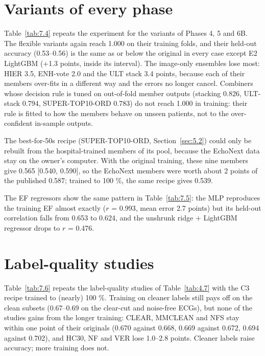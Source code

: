 \section{Variants of every phase}\label{sec:7.4}

Table~\ref{tab:7.4} repeats the experiment for the variants of Phases 4, 5 and 6B. The flexible variants again reach 1.000 on their training folds, and their held-out accuracy (0.53--0.56) is the same as or below the original in every case except E2 LightGBM (+1.3 points, inside its interval). The image-only ensembles lose most: HIER 3.5, ENH-vote 2.0 and the ULT stack 3.4 points, because each of their members over-fits in a different way and the errors no longer cancel. Combiners whose decision rule is tuned on out-of-fold member outputs (stacking 0.826, ULT-stack 0.794, SUPER-TOP10-ORD 0.783) do not reach 1.000 in training: their rule is fitted to how the members behave on unseen patients, not to the over-confident in-sample outputs.

The best-for-50s recipe (SUPER-TOP10-ORD, Section~\ref{sec:5.2}) could only be rebuilt from the hospital-trained members of its pool, because the EchoNext data stay on the owner's computer. With the original training, these nine members give 0.565 [0.540, 0.590], so the EchoNext members were worth about 2 points of the published 0.587; trained to 100 \%, the same recipe gives 0.539.



The EF regressors show the same pattern in Table~\ref{tab:7.5}: the MLP reproduces the training EF almost exactly ($r$ = 0.993, mean error 2.7 points) but its held-out correlation falls from 0.653 to 0.624, and the unshrunk ridge + LightGBM regressor drops to $r$ = 0.476.



\section{Label-quality studies}\label{sec:7.5}

Table~\ref{tab:7.6} repeats the label-quality studies of Table~\ref{tab:4.7} with the C3 recipe trained to (nearly) 100 \%. Training on cleaner labels still pays off on the clean subsets (0.67--0.69 on the clear-cut and noise-free ECGs), but none of the studies gains from the longer training: CLEAR, MMCLEAN and NFS stay within one point of their originals (0.670 against 0.668, 0.669 against 0.672, 0.694 against 0.702), and HC30, NF and VER lose 1.0--2.8 points. Cleaner labels raise accuracy; more training does not.

